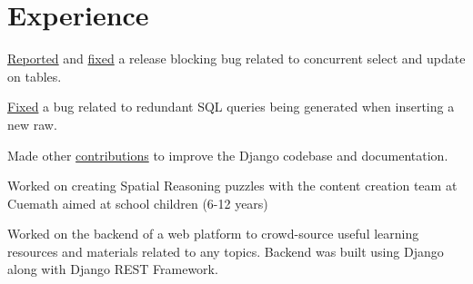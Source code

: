 \documentclass[]{abhijeet_viswa-deedy-resume-openfont}
\begin{document}
\hfill
\begin{minipage}[t]{0.70\textwidth}


\section{Experience}
\vspace{\topsep} %
\begin{tightemize}
\item \href{https://code.djangoproject.com/ticket/31246}{Reported} and \href{https://github.com/django/django/pull/12434}{fixed}
a release blocking bug related to concurrent select and update on tables.
\item \justifying\href{https://github.com/django/django/pull/12496}{Fixed} a bug related to redundant SQL queries being generated when
inserting a new raw.
\item \justifying Made other \href{https://github.com/django/django/pulls?q=author\%3Aabhijeetviswa}{contributions} to improve the Django codebase and
documentation.
\end{tightemize}
\subsectionsep

\begin{tightemize}
\item Worked on creating Spatial Reasoning puzzles with the content creation team at Cuemath aimed at school children (6-12 years)
\item Worked on the backend of a web platform to crowd-source useful learning resources and materials related to any topics.
Backend was built using Django along with Django REST Framework.
\end{tightemize}
\primarysectionsep  %

\subsectionsep %

\end{minipage}
\end{document}
